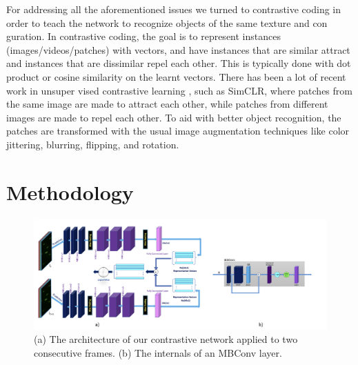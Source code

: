 \documentclass[./dissertation.tex]{subfiles}
\begin{document}
For addressing all the aforementioned issues we turned to contrastive coding in order to teach the network to recognize objects of the same texture and con guration. In contrastive coding, the goal is to represent instances (images/videos/patches) with vectors, and have instances that are similar attract and instances that are dissimilar repel each other. This is typically done with dot product or cosine similarity on the learnt vectors. There has been a lot of recent work in unsuper vised contrastive learning \cite{oord2018representation,he2020momentum,chen2020improved}, such as SimCLR\cite{chen2020simple,chen2020big}, where patches from the same image are made to attract each other, while patches from different images are made to repel each other. To aid with better object recognition, the patches are transformed with the usual image augmentation techniques like color jittering, blurring, flipping, and rotation.






\label{cc:Methodology}
\section{Methodology}
\begin{figure}
    \includegraphics[width=\textwidth]{./figures/cc/arch.jpg}
    \caption{(a) The architecture of our contrastive network applied to two consecutive frames. (b) The internals of an MBConv layer.} \label{fig:architecture}
\end{figure}
\end{document}
